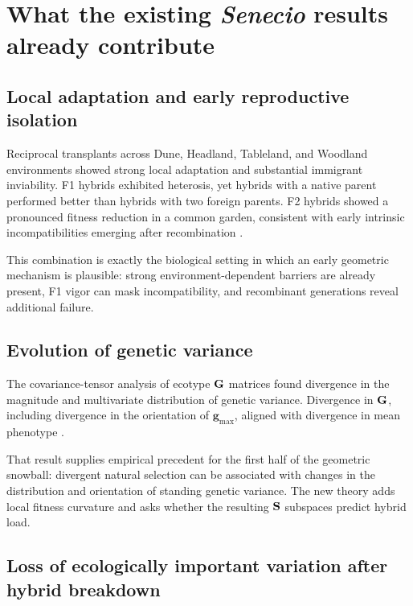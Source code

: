 \chapter{What the existing \textit{Senecio} results already contribute}

\section{Local adaptation and early reproductive isolation}

Reciprocal transplants across Dune, Headland, Tableland, and Woodland environments showed strong local adaptation and substantial immigrant inviability. F1 hybrids exhibited heterosis, yet hybrids with a native parent performed better than hybrids with two foreign parents. F2 hybrids showed a pronounced fitness reduction in a common garden, consistent with early intrinsic incompatibilities emerging after recombination \cite{walter2016}.

\begin{biobox}
This combination is exactly the biological setting in which an early geometric mechanism is plausible: strong environment-dependent barriers are already present, F1 vigor can mask incompatibility, and recombinant generations reveal additional failure.
\end{biobox}

\section{Evolution of genetic variance}

The covariance-tensor analysis of ecotype \(\mathbf{G}\) matrices found divergence in the magnitude and multivariate distribution of genetic variance. Divergence in \(\mathbf{G}\), including divergence in the orientation of \(\mathbf g_{\max}\), aligned with divergence in mean phenotype \cite{walter2018}.

\begin{connectionbox}
That result supplies empirical precedent for the first half of the geometric snowball: divergent natural selection can be associated with changes in the distribution and orientation of standing genetic variance. The new theory adds local fitness curvature and asks whether the resulting \(\mathbf{S}\) subspaces predict hybrid load.
\end{connectionbox}

\section{Loss of ecologically important variation after hybrid breakdown}

